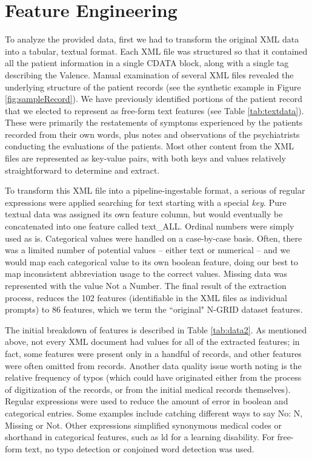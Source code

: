 \chapter{Feature Engineering}\label{sec:features}

To analyze the provided data, first we had to transform the original XML data into a tabular, textual format. Each XML file was structured so that it contained all the patient information in a single CDATA block, along with a single tag describing the Valence. Manual examination of several XML files revealed the underlying structure of the patient records (see the synthetic example in Figure \ref{fig:sampleRecord}).  
We have previously identified portions of the patient record that we elected
to represent as free-form text features (see Table \ref{tab:textdata}). 
These were primarily the restatements of  symptoms experienced
by the patients recorded from
their own words, plus notes and observations of the psychiatrists conducting the
evaluations of the patients.  Most other content from the XML files 
are represented as key-value pairs, with both keys and values relatively straightforward
to determine and extract. 

To transform this XML file into a pipeline-ingestable format, a serious of regular expressions were applied searching for text starting with a special \textit{key}. Pure textual data was assigned its own feature column, but would eventually be concatenated into one feature called \textsf{text\_ALL}. Ordinal numbers were simply used as is. Categorical values were handled on a case-by-case basis. Often, there was a limited number of potential values -- either text or numerical -- and we would map each categorical value to its own boolean feature, doing our best to map inconsistent abbreviation usage to the correct values. Missing data was represented with the value \textsf{Not a Number}. The final result of the extraction process, reduces the 102
features (identifiable in the XML files as individual prompts) to 86 features, which
we term the ``original" N-GRID dataset features.

The initial breakdown of features is described in Table \ref{tab:data2}.  As mentioned above, not every
 XML document had values for all of the extracted features; in fact, some features were
 present only in a handful of records, and other features were often omitted from records. Another data quality issue worth noting is the relative frequency of typos (which could have originated either from the process of digitization of the records, or from the initial medical records themselves). Regular expressions were used to reduce the amount of error in boolean and categorical entries. Some examples include catching different ways to say \textsf{No}: \textsf{N}, \textsf{Missing} or  \textsf{Not}. Other expressions simplified synonymous medical codes or shorthand in categorical features, such as \textsf{ld} for a \textsf{learning disability}. For free-form text, no typo detection or conjoined word detection was used. 
 
